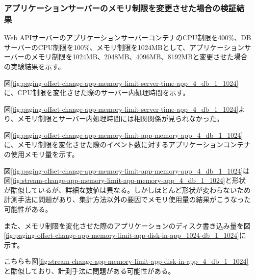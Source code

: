 \documentclass[../../../../main]{subfiles}
\begin{document}
    \subsubsection{アプリケーションサーバーのメモリ制限を変更させた場合の検証結果}\label{subsubsec:result-paging-offset-change-app-memory}

    Web APIサーバーのアプリケーションサーバーコンテナのCPU制限を400\%、DBサーバーのCPU制限を100\%、メモリ制限を1024MBとして、アプリケーションサーバーのメモリ制限を1024MB、2048MB、4096MB、8192MBと変更させた場合の実験結果を示す。


    図\ref{fig:paging-offset-change-app-memory-limit-server-time-app_4_db_1_1024}に、CPU制限を変化させた際のサーバー内処理時間を示す。

    

    図\ref{fig:paging-offset-change-app-memory-limit-server-time-app_4_db_1_1024}より、メモリ制限とサーバー内処理時間には相関関係が見られなかった。


    図\ref{fig:paging-offset-change-app-memory-limit-app-memory-app_4_db_1_1024}に、メモリ制限を変化させた際のイベント数に対するアプリケーションコンテナの使用メモリ量を示す。

    

    図\ref{fig:paging-offset-change-app-memory-limit-app-memory-app_4_db_1_1024}は図\ref{fig:stream-change-app-memory-limit-app-memory-app_4_db_1_1024}と形状が酷似しているが、詳細な数値は異なる。しかしほとんど形状が変わらないため計測手法に問題があり、集計方法以外の要因でメモリ使用量の結果がこうなった可能性がある。


    また、メモリ制限を変化させた際のアプリケーションのディスク書き込み量を図\ref{fig:paging-offset-change-app-memory-limit-app-disk-in-app_1024-db_1_1024}に示す。

    

    こちらも図\ref{fig:stream-change-app-memory-limit-app-disk-in-app_4_db_1_1024}と酷似しており、計測手法に問題がある可能性がある。
\end{document}

